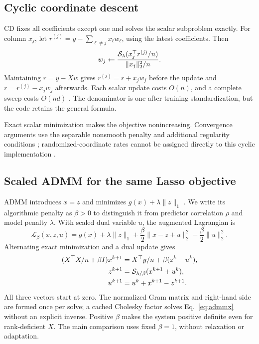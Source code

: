 \documentclass[10pt,letterpaper]{article}
\begin{document}
\subsection{Cyclic coordinate descent}
CD fixes all coefficients except one and solves the scalar subproblem exactly. For column $x_j$, let $r^{(j)}=y-\sum_{\ell\ne j}x_\ell w_\ell$, using the latest coefficients. Then
\begin{equation}
 w_j\leftarrow\frac{\mathcal{S}_\lambda(x_j^\top r^{(j)}/n)}{\|x_j\|_2^2/n}.
 \label{eq:cd}
\end{equation}
Maintaining $r=y-Xw$ gives $r^{(j)}=r+x_jw_j$ before the update and $r=r^{(j)}-x_jw_j$ afterwards. Each scalar update costs $O(n)$, and a complete sweep costs $O(nd)$ \citep{wu2008,friedman2010}. The denominator is one after training standardization, but the code retains the general formula.

Exact scalar minimization makes the objective nonincreasing. Convergence arguments use the separable nonsmooth penalty and additional regularity conditions \citep{tseng2001}; randomized-coordinate rates cannot be assigned directly to this cyclic implementation \citep{wright2015}.

\subsection{Scaled ADMM for the same Lasso objective}
ADMM introduces $x=z$ and minimizes $g(x)+\lambda\|z\|_1$ \citep{boyd2011}. We write its algorithmic penalty as $\beta>0$ to distinguish it from predictor correlation $\rho$ and model penalty $\lambda$. With scaled dual variable $u$, the augmented Lagrangian is
\begin{equation}
 \mathcal{L}_\beta(x,z,u)=g(x)+\lambda\|z\|_1
 +\frac{\beta}{2}\|x-z+u\|_2^2-\frac{\beta}{2}\|u\|_2^2.
\end{equation}
Alternating exact minimization and a dual update gives
\begin{align}
 (X^\top X/n+\beta I)x^{k+1}&=X^\top y/n+\beta(z^k-u^k),\label{eq:admmx}\\
 z^{k+1}&=\mathcal{S}_{\lambda/\beta}(x^{k+1}+u^k),\\
 u^{k+1}&=u^k+x^{k+1}-z^{k+1}.\label{eq:admmu}
\end{align}
All three vectors start at zero. The normalized Gram matrix and right-hand side are formed once per solve; a cached Cholesky factor solves Eq.~\eqref{eq:admmx} without an explicit inverse. Positive $\beta$ makes the system positive definite even for rank-deficient $X$. The main comparison uses fixed $\beta=1$, without relaxation or adaptation.
\end{document}
